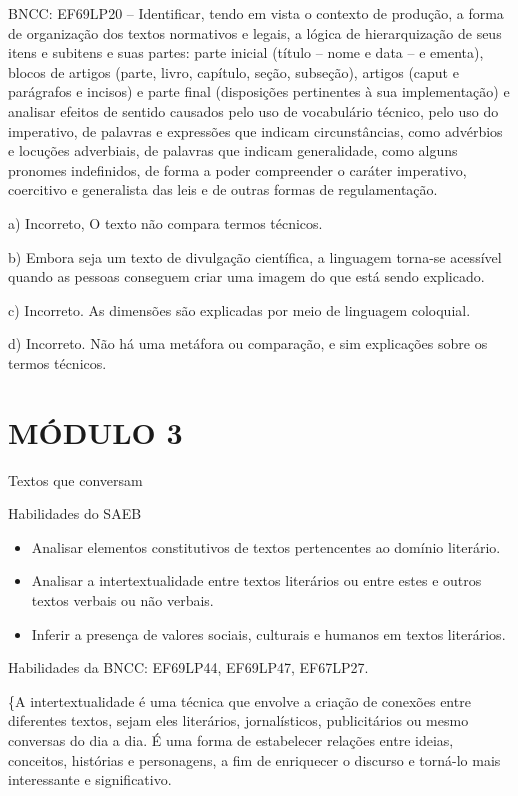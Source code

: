 BNCC: EF69LP20 -- Identificar, tendo em vista o contexto de produção, a
forma de organização dos textos normativos e legais, a lógica de
hierarquização de seus itens e subitens e suas partes: parte inicial
(título -- nome e data -- e ementa), blocos de artigos (parte, livro,
capítulo, seção, subseção), artigos (caput e parágrafos e incisos) e
parte final (disposições pertinentes à sua implementação) e analisar
efeitos de sentido causados pelo uso de vocabulário técnico, pelo uso do
imperativo, de palavras e expressões que indicam circunstâncias, como
advérbios e locuções adverbiais, de palavras que indicam generalidade,
como alguns pronomes indefinidos, de forma a poder compreender o caráter
imperativo, coercitivo e generalista das leis e de outras formas de
regulamentação.

a) Incorreto, O texto não compara termos técnicos.

b) Embora seja um texto de divulgação científica, a linguagem torna-se
acessível quando as pessoas conseguem criar uma imagem do que está sendo
explicado.

c) Incorreto. As dimensões são explicadas por meio de linguagem
coloquial.

d) Incorreto. Não há uma metáfora ou comparação, e sim explicações sobre
os termos técnicos.

\hypertarget{muxf3dulo-3}{%
\section{MÓDULO 3}\label{muxf3dulo-3}}

Textos que conversam

Habilidades do SAEB

\begin{itemize}
\tightlist
\item
  Analisar elementos constitutivos de textos pertencentes ao domínio
  literário.
\item
  Analisar a intertextualidade entre textos literários ou entre estes e
  outros textos verbais ou não verbais.
\item
  Inferir a presença de valores sociais, culturais e humanos em textos
  literários.
\end{itemize}

Habilidades da BNCC: EF69LP44, EF69LP47, EF67LP27.


\{A intertextualidade é uma técnica que envolve a criação de conexões
entre diferentes textos, sejam eles literários, jornalísticos,
publicitários ou mesmo conversas do dia a dia. É uma forma de
estabelecer relações entre ideias, conceitos, histórias e personagens, a
fim de enriquecer o discurso e torná-lo mais interessante e
significativo.

